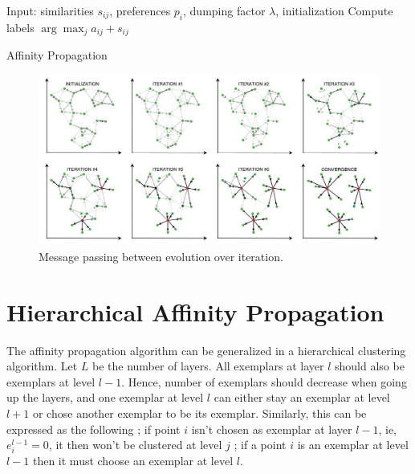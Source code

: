 \documentclass{ipol}
\begin{document}
\begin{algorithm}[h]
  \SetLine
  Input: similarities $s_{ij}$, preferences $p_i$, dumping factor $\lambda$, \;
  initialization\;
  Compute labels $\arg \max_{j} a_{ij} + s_{ij}$ \;
  \caption{Affinity Propagation}
\end{algorithm}

\begin{figure}
\includegraphics[width=500px]{./images/AP_frey.png}
\caption{Message passing between evolution over iteration.}
\end{figure}

\section{Hierarchical Affinity Propagation}

The affinity propagation algorithm can be generalized in a hierarchical
clustering algorithm. Let $L$ be the number of layers. All exemplars at layer
$l$ should also be exemplars at level $l -1$. Hence, number of exemplars
should decrease when going up the layers, and one exemplar at level $l$ can
either stay an exemplar at level $l + 1$ or chose another exemplar to be its
exemplar. Similarly, this can be expressed as the following ; if point $i$ isn't chosen as
exemplar at layer $l - 1$, ie, $e_{i}^{l - 1} = 0$, it then won't be clustered at
level $j$ ; if a point $i$ is an exemplar at level $l -1$ then it must choose
an exemplar at level $l$.\\
\end{document}
